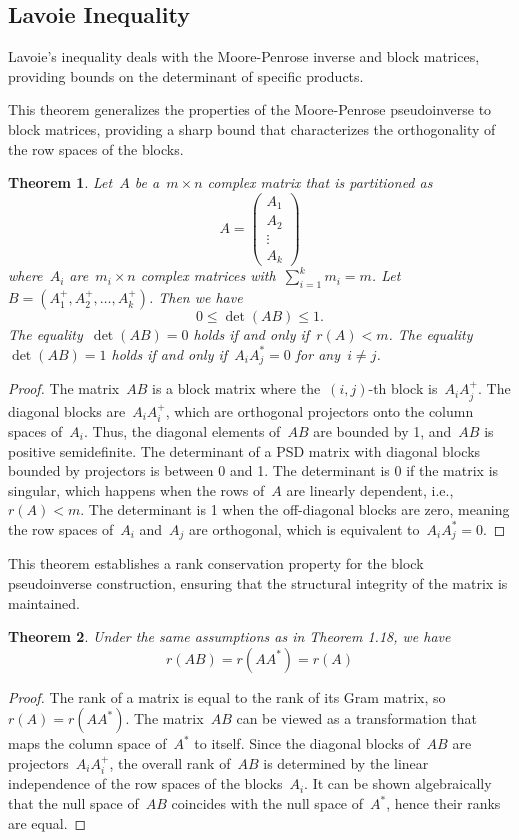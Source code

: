 \documentclass[12pt]{article}
\newtheorem{theorem}{Theorem}[section]
\begin{document}
\subsection{Lavoie Inequality}
Lavoie's inequality deals with the Moore-Penrose inverse and block matrices, providing bounds on the determinant of specific products.

\noindent This theorem generalizes the properties of the Moore-Penrose pseudoinverse to block matrices, providing a sharp bound that characterizes the orthogonality of the row spaces of the blocks.
\begin{theorem}
Let~$A$ be a~$m \times n$ complex matrix that is partitioned as
\[ A = \begin{pmatrix} A_1 \\ A_2 \\ \vdots \\ A_k \end{pmatrix} \]
where~$A_i$ are~$m_i \times n$ complex matrices with~$\sum_{i=1}^k m_i = m$. Let~$B = (A_1^+, A_2^+, \dots, A_k^+)$. Then we have
\[ 0 \le \det(AB) \le 1. \]
The equality~$\det(AB) = 0$ holds if and only if~$r(A) < m$. The equality~$\det(AB) = 1$ holds if and only if~$A_i A_j^* = 0$ for any~$i \neq j$.
\end{theorem}
\begin{proof}
The matrix~$AB$ is a block matrix where the~$(i,j)$-th block is~$A_i A_j^+$. The diagonal blocks are~$A_i A_i^+$, which are orthogonal projectors onto the column spaces of~$A_i$. Thus, the diagonal elements of~$AB$ are bounded by 1, and~$AB$ is positive semidefinite. The determinant of a PSD matrix with diagonal blocks bounded by projectors is between 0 and 1. The determinant is 0 if the matrix is singular, which happens when the rows of~$A$ are linearly dependent, i.e.,~$r(A) < m$. The determinant is 1 when the off-diagonal blocks are zero, meaning the row spaces of~$A_i$ and~$A_j$ are orthogonal, which is equivalent to~$A_i A_j^* = 0$.
\end{proof}

\noindent This theorem establishes a rank conservation property for the block pseudoinverse construction, ensuring that the structural integrity of the matrix is maintained.
\begin{theorem}
Under the same assumptions as in Theorem 1.18, we have
\[ r(AB) = r(AA^*) = r(A) \]
\end{theorem}
\begin{proof}
The rank of a matrix is equal to the rank of its Gram matrix, so~$r(A) = r(AA^*)$. The matrix~$AB$ can be viewed as a transformation that maps the column space of~$A^*$ to itself. Since the diagonal blocks of~$AB$ are projectors~$A_i A_i^+$, the overall rank of~$AB$ is determined by the linear independence of the row spaces of the blocks~$A_i$. It can be shown algebraically that the null space of~$AB$ coincides with the null space of~$A^*$, hence their ranks are equal.
\end{proof}
\end{document}
